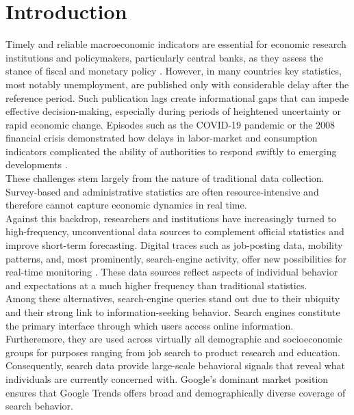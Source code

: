 \documentclass[12pt,a4paper]{article}
\begin{document}

\section{Introduction}
Timely and reliable macroeconomic indicators are essential for economic research institutions and policymakers, particularly central banks, as they assess the stance of fiscal and monetary policy \citep{simoni, BANBURA2013195}.
However, in many countries key statistics, most notably unemployment, are published only with considerable delay after the reference period.
Such publication lags create informational gaps that can impede effective decision-making, especially during periods of heightened uncertainty or rapid economic change. Episodes such as the COVID-19 pandemic or the 2008 financial crisis demonstrated how delays in labor-market and consumption indicators complicated the ability of authorities to respond swiftly to emerging developments \citep{covid}.
\\
These challenges stem largely from the nature of traditional data collection.
Survey-based and administrative statistics are often resource-intensive and therefore cannot capture economic dynamics in real time.
\\
Against this backdrop, researchers and institutions have increasingly turned to high-frequency, unconventional data sources to complement official statistics and improve short-term forecasting.
Digital traces such as job-posting data, mobility patterns, and, most prominently, search-engine activity, offer new possibilities for real-time monitoring \citep{BARBAGLIA20231548}. These data sources reflect aspects of individual behavior and expectations at a much higher frequency than traditional statistics.
\\
Among these alternatives, search-engine queries stand out due to their ubiquity and their strong link to information-seeking behavior.
Search engines constitute the primary interface through which users access online information.
Furtheremore, they are used across virtually all demographic and socioeconomic groups for purposes ranging from job search to product research and education.
Consequently, search data provide large-scale behavioral signals that reveal what individuals are currently concerned with.
Google’s dominant market position ensures that Google Trends offers broad and demographically diverse coverage of search behavior.\\
\end{document}
